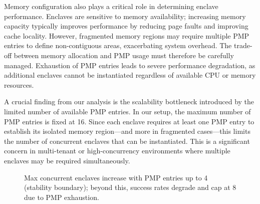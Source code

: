 Memory configuration also plays a critical role in determining enclave performance. Enclaves are sensitive to memory availability; increasing memory capacity typically improves performance by reducing page faults and improving cache locality. However, fragmented memory regions may require multiple PMP entries to define non-contiguous areas, exacerbating system overhead. The trade-off between memory allocation and PMP usage must therefore be carefully managed. Exhaustion of PMP entries leads to severe performance degradation, as additional enclaves cannot be instantiated regardless of available CPU or memory resources.

A crucial finding from our analysis is the scalability bottleneck introduced by the limited number of available PMP entries. In our setup, the maximum number of PMP entries is fixed at 16. Since each enclave requires at least one PMP entry to establish its isolated memory region—and more in fragmented cases—this limits the number of concurrent enclaves that can be instantiated. This is a significant concern in multi-tenant or high-concurrency environments where multiple enclaves may be required simultaneously.

\begin{figure}[htbp]
\centering
{}
\caption{Max concurrent enclaves increase with PMP entries up to 4 (stability boundary); beyond this, success rates degrade and cap at 8 due to PMP exhaustion.}
\end{figure}

